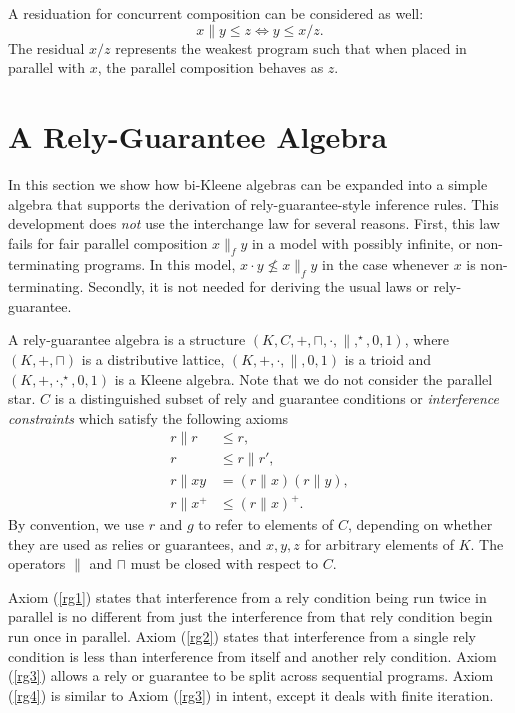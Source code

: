 \documentclass{llncs}
\begin{document}
A residuation for concurrent composition can be considered as well:
\begin{equation*}
x\|y \le z \Leftrightarrow y \le x/z.
\end{equation*}
The residual $x/z$ represents the weakest program such that when
placed in parallel with $x$, the parallel composition behaves as $z$.


\section{A  Rely-Guarantee Algebra}
\label{sec:RG}

In this section we show how bi-Kleene algebras can be expanded into a
simple algebra that supports the derivation of rely-guarantee-style
inference rules. This development does \emph{not} use the interchange
law for several reasons. First, this law fails for fair parallel
composition $x\parallel_f y$ in a model with possibly infinite, or
non-terminating programs. In this model, $x \cdot y \not\leq x
\parallel_f y$ in the case whenever $x$ is non-terminating. Secondly,
it is not needed for deriving the usual laws or rely-guarantee.

A rely-guarantee algebra is a structure
$(K,C,+,\sqcap,\cdot,\|,^\star,0,1)$, where $(K,+,\sqcap)$ is a
distributive lattice, $(K,+,\cdot,\|,0,1)$ is a trioid and
$(K,+,\cdot,^\star,0,1)$ is a Kleene algebra. Note that we do not
consider the parallel star. $C$ is a distinguished subset of rely and
guarantee conditions or \emph{interference constraints} which satisfy
the following axioms
\begin{align}
r\|r &\le r, \label{rg1}\\
r &\le r\|r', \label{rg2}\\
r\|xy &= (r\|x)(r\|y), \label{rg3}\\
r\|x^+ &\le (r\|x)^+ \label{rg4}.
\end{align}
By convention, we use $r$ and $g$ to refer to elements of $C$,
depending on whether they are used as relies or guarantees, and
$x,y,z$ for arbitrary elements of $K$. The operators $\|$ and $\sqcap$
must be closed with respect to $C$.

Axiom (\ref{rg1}) states that interference from a rely condition being
run twice in parallel is no different from just the interference from
that rely condition begin run once in parallel. Axiom (\ref{rg2})
states that interference from a single rely condition is less than
interference from itself and another rely condition. Axiom (\ref{rg3})
allows a rely or guarantee to be split across sequential
programs. Axiom (\ref{rg4}) is similar to Axiom (\ref{rg3}) in intent,
except it deals with finite iteration.
\end{document}
